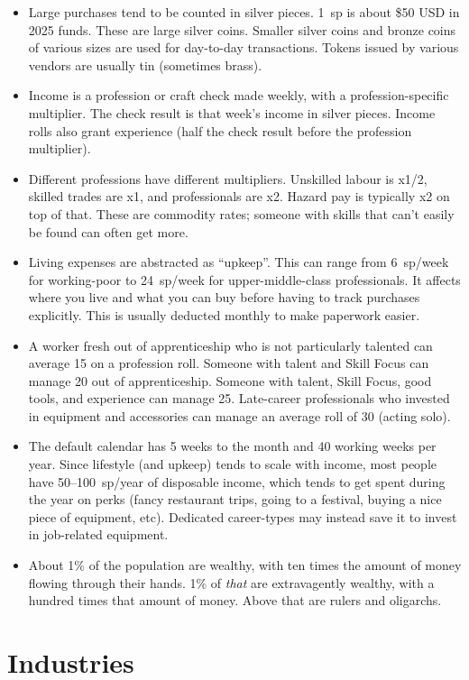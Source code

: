 \begin{itemize}
%
\item Large purchases tend to be counted in silver pieces. 1~sp is about
\$50 USD in 2025 funds. These are large silver coins. Smaller silver coins
and bronze coins of various sizes are used for day-to-day transactions.
Tokens issued by various vendors are usually tin (sometimes brass).
%
\item Income is a profession or craft check made weekly, with a
profession-specific multiplier. The check result is that week's income in
silver pieces. Income rolls also grant experience (half the check result
before the profession multiplier).
%
\item Different professions have different multipliers. Unskilled labour is
x1/2, skilled trades are x1, and professionals are x2. Hazard pay is
typically x2 on top of that. These are commodity rates; someone with skills
that can't easily be found can often get more.
%
\item Living expenses are abstracted as ``upkeep''. This can range from
6~sp/week for working-poor to 24~sp/week for upper-middle-class
professionals. It affects where you live and what you can buy before having
to track purchases explicitly. This is usually deducted monthly to make
paperwork easier.
%
\item A worker fresh out of apprenticeship who is not particularly talented
can average 15 on a profession roll. Someone with talent and Skill Focus can
manage 20 out of apprenticeship. Someone with talent, Skill Focus, good
tools, and experience can manage 25. Late-career professionals who invested
in equipment and accessories can manage an average roll of 30 (acting solo).
%
\item The default calendar has 5 weeks to the month and 40 working weeks per
year. Since lifestyle (and upkeep) tends to scale with income, most people
have 50--100~sp/year of disposable income, which tends to get spent during
the year on perks (fancy restaurant trips, going to a festival, buying a nice
piece of equipment, etc). Dedicated career-types may instead save it to
invest in job-related equipment.
%
\item About 1\% of the population are wealthy, with ten times the amount of
money flowing through their hands. 1\% of \textit{that} are extravagently
wealthy, with a hundred times that amount of money. Above that are rulers
and oligarchs.
%
\end{itemize}

%
%
%
\section{Industries}
\label{sect-over-demo}


